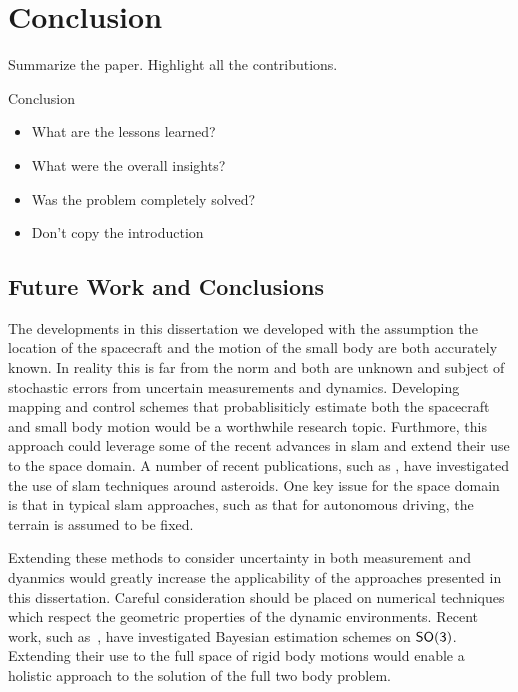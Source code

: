 
\chapter{Conclusion}\label{sec:conclusion}
Summarize the paper. 
Highlight all the contributions.

Conclusion
\begin{itemize}
    \item What are the lessons learned?
    \item What were the overall insights?
    \item Was the problem completely solved? 
    \item Don't copy the introduction
\end{itemize}

\section{Future Work and Conclusions}

The developments in this dissertation we developed with the assumption the location of the spacecraft and the motion of the small body are both accurately known.
In reality this is far from the norm and both are unknown and subject of stochastic errors from uncertain measurements and dynamics. 
Developing mapping and control schemes that probablisiticly estimate both the spacecraft and small body motion would be a worthwhile research topic.
Furthmore, this approach could leverage some of the recent advances in \gls{slam} and extend their use to the space domain.
A number of recent publications, such as \textcite{cocaud2010,cocaud2012,vassallo2015}, have investigated the use of \gls{slam} techniques around asteroids.
One key issue for the space domain is that in typical \gls{slam} approaches, such as that for autonomous driving, the terrain is assumed to be fixed.

Extending these methods to consider uncertainty in both measurement and dyanmics would greatly increase the applicability of the approaches presented in this dissertation.
Careful consideration should be placed on numerical techniques which respect the geometric properties of the dynamic environments.
Recent work, such as~\textcite{kulumani2017}, have investigated Bayesian estimation schemes on \( \mathsf{SO(3)} \). 
Extending their use to the full space of rigid body motions would enable a holistic approach to the solution of the full two body problem.


